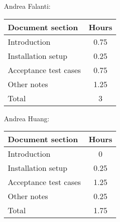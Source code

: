 Andrea Falanti:

\begin{tabular}{|l|c|}
    \hline
    Document section & Hours\\
    \hline
     Introduction & 0.75\\
     Installation setup & 0.25\\
     Acceptance test cases & 0.75\\
     Other notes & 1.25\\
     \hline
     Total & 3\\
     \hline
\end{tabular}

\vskip 0.3in

Andrea Huang:

\begin{tabular}{|l|c|}
    \hline
    Document section & Hours \\
    \hline
     Introduction & 0\\
     Installation setup & 0.25\\
     Acceptance test cases & 1.25\\
     Other notes & 0.25\\
     \hline
     Total & 1.75\\
     \hline
\end{tabular}